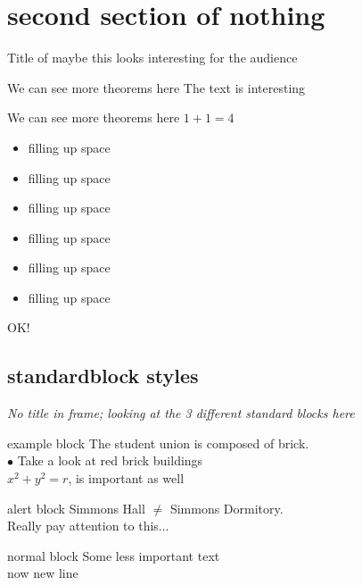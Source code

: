 \documentclass{beamer}
\begin{document}
\section{second section of nothing}
\begin{frame}{Title of maybe this looks interesting for the audience}

  \begin{block}{We can see more theorems here}
    The text is interesting
  \end{block}
  \begin{block}{We can see more theorems here}
    $1+1 = 4$
    \begin{itemize}
    \item filling up space
    \item filling up space
    \item filling up space
    \item filling up space
    \item filling up space
    \item filling up space
    \end{itemize}
    OK!
  \end{block}
  
\end{frame}

\subsection{standardblock styles}

\begin{frame}{}

  \emph{{\large No title in frame}; looking at the 3 different standard blocks here}
  
  \begin{exampleblock}{example block}
    The student union is composed of brick.\\
    $\bullet$ Take a look at red brick buildings\\
    $x^2 + y^2 = r$, is important as well
  \end{exampleblock}
  
  \begin{alertblock}{alert block}    
    Simmons Hall $\not=$ Simmons Dormitory.
    \\
    Really pay attention to this$\ldots$
  \end{alertblock}

  \begin{block}{normal block}
    Some less important text\\
    now new line
  \end{block}
  
  
\end{frame}
\end{document}
